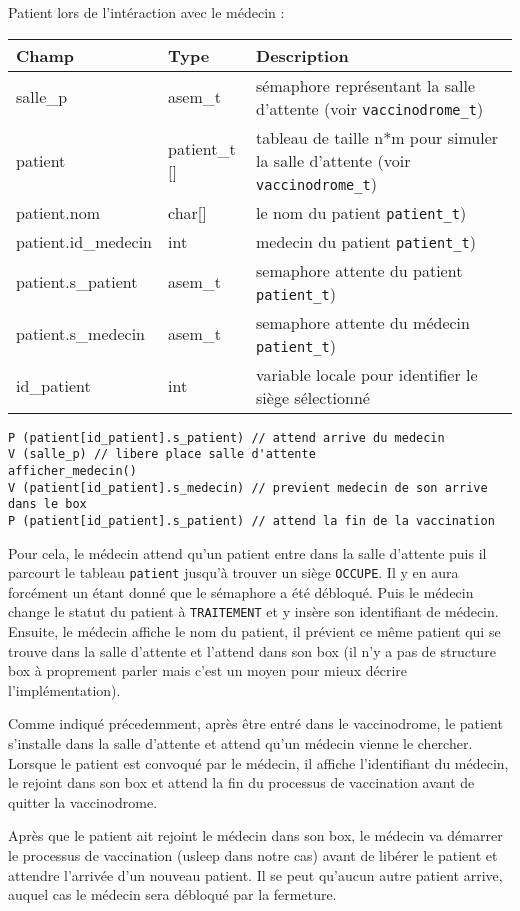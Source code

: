 \documentclass[a4paper]{article}
\begin{document}
Patient lors de l'intéraction avec le médecin :
\bigskip \newline
\begin{tabularx}{\linewidth}{|l|l|>{\strut}X|}
  \hline%
  Champ & Type & Description \\ \hline%
  salle\_p & asem\_t & sémaphore représentant la salle d'attente (voir \texttt{vaccinodrome\_t}) \\ \hline%
  patient & patient\_t [] & tableau de taille n*m pour simuler la salle d’attente (voir \texttt{vaccinodrome\_t})  \\ \hline%
  patient.nom & char[] & le nom du patient \texttt{patient\_t})\\ \hline%
  patient.id\_medecin & int & medecin du patient \texttt{patient\_t})\\ \hline%
  patient.s\_patient & asem\_t & semaphore attente du patient \texttt{patient\_t}) \\ \hline%
  patient.s\_medecin & asem\_t & semaphore attente du médecin \texttt{patient\_t})\\ \hline%
  id\_patient & int & variable locale pour identifier le siège sélectionné \\ \hline%
\end{tabularx}

\begin{verbatim}
P (patient[id_patient].s_patient) // attend arrive du medecin
V (salle_p) // libere place salle d'attente
afficher_medecin()
V (patient[id_patient].s_medecin) // previent medecin de son arrive dans le box
P (patient[id_patient].s_patient) // attend la fin de la vaccination
\end{verbatim}

\medskip \par Pour cela, le médecin attend qu'un patient entre dans la salle d'attente puis il parcourt le tableau \texttt{patient} jusqu'à trouver un siège \texttt{OCCUPE}. Il y en aura forcément un étant donné que le sémaphore a été débloqué. Puis le médecin change le statut du patient à \texttt{TRAITEMENT} et y insère son identifiant de médecin. Ensuite, le médecin affiche le nom du patient, il prévient ce même patient qui se trouve dans la salle d'attente et l'attend dans son box (il n'y a pas de structure box à proprement parler mais c'est un moyen pour mieux décrire l'implémentation).
\medskip \par Comme indiqué précedemment, après être entré dans le vaccinodrome, le patient s'installe dans la salle d'attente et attend qu'un médecin vienne le chercher. Lorsque le patient est convoqué par le médecin, il affiche l'identifiant du médecin, le rejoint dans son box et attend la fin du processus de vaccination avant de quitter la vaccinodrome.
\medskip \par Après que le patient ait rejoint le médecin dans son box, le médecin va démarrer le processus de vaccination (usleep dans notre cas) avant de libérer le patient et attendre l'arrivée d'un nouveau patient. Il se peut qu'aucun autre patient arrive, auquel cas le médecin sera débloqué par la fermeture.
\end{document}
